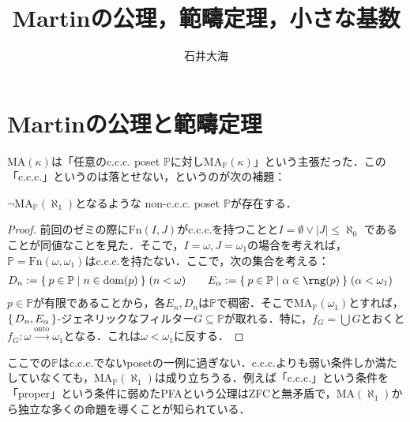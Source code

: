 \documentclass[a4j]{bxjsarticle}
\title{Martinの公理，範疇定理，小さな基数}
\author{石井大海}
\newcommand{\MA}{\mathrm{MA}}
\theoremstyle{definition}
\begin{document}
\maketitle
\section{Martinの公理と範疇定理}
$\mathrm{MA}(\kappa)$は「任意のc.c.c. poset $\mathbb{P}$に対し$\mathrm{MA}_\mathbb{P}(\kappa)$」という主張だった．この「c.c.c.」というのは落とせない，というのが次の補題：

\begin{lemma}
 $\neg \mathrm{MA}_{\mathbb{P}}(\aleph_1)$となるような non-c.c.c. poset $\mathbb{P}$が存在する．
\end{lemma}
\begin{proof}
 前回のゼミの際に$\mathrm{Fn}(I, J)$がc.c.c.を持つことと$I = \emptyset \vee |J| \leq \aleph_0$ であることが同値なことを見た．そこで，$I = \omega, J = \omega_1$の場合を考えれば，$\mathbb{P} = \mathrm{Fn}(\omega, \omega_1)$はc.c.c.を持たない．ここで，次の集合を考える：
 \begin{align*}
  D_n \defeq \Set{ p \in \mathbb{P} | n \in \dom(p)} & \;(n < \omega) & \quad E_\alpha \defeq \Set{ p \in \mathbb{P} | \alpha \in \rng(p)} & \; (\alpha < \omega_1)
 \end{align*}
 $p \in \mathbb{P}$が有限であることから，各$E_n, D_n$は$\mathbb{P}$で稠密．そこで$\mathrm{MA}_{\mathbb{P}}(\omega_1)$とすれば，$\set{D_n, E_\alpha}$-ジェネリックなフィルター$G \subseteq \mathbb{P}$が取れる．特に，$f_G = \bigcup G$とおくと$f_G : \omega \xrightarrow{\text{onto}} \omega_1$となる．これは$\omega < \omega_1$に反する．\mbox{}
\end{proof}

ここでの$\mathbb{P}$はc.c.c.でないposetの一例に過ぎない．c.c.c.よりも弱い条件しか満たしていなくても，$\MA_\mathbb{P}(\aleph_1)$は成り立ちうる．例えば「c.c.c.」という条件を「proper」という条件に弱めたPFAという公理はZFCと無矛盾で，$\MA(\aleph_1)$から独立な多くの命題を導くことが知られている．
\end{document}
